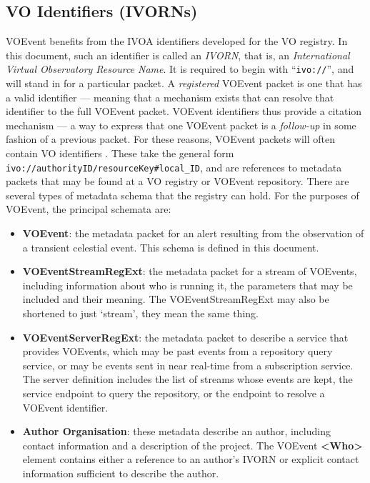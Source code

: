 \documentclass[11pt,a4paper]{ivoa}
\begin{document}
\subsection{VO Identifiers (IVORNs)}
\label{sec:2.2}
VOEvent benefits from the IVOA identifiers developed for the VO registry.
In this document, such
an identifier is called an \emph{IVORN}, that is, an \emph{International Virtual
Observatory Resource Name}. It is required to begin with ``{\tt ivo://}'', and
will stand in for a particular packet. A \emph{registered} VOEvent packet is one
that has a valid identifier --- meaning that a mechanism exists that can resolve
that identifier to the full VOEvent packet. VOEvent identifiers thus provide a
citation mechanism --- a way to express that one VOEvent packet is a
\emph{follow-up} in some fashion of a previous packet. For these reasons,
VOEvent packets will often contain VO identifiers \citep{2016ivoa.spec.0523D}.
These take the general form {\tt ivo://authorityID/resourceKey\#local\_ID}, and
are references to metadata packets that may be found at a VO registry or VOEvent
repository. There are several types of metadata schema that the registry can
hold. For the purposes of VOEvent, the principal schemata are:
\begin{itemize}
\item {\bf VOEvent}: the metadata packet for an alert resulting from the
observation of a transient celestial event. This schema is defined in this
document.
\item {\bf VOEventStreamRegExt}: the metadata packet for a stream of VOEvents,
including information about who is running it, the parameters that may be
included and their meaning. The VOEventStreamRegExt may also be shortened to
just `stream', they mean the same thing.
\item {\bf VOEventServerRegExt}: the metadata packet to describe a service that
provides VOEvents, which may be past events from a repository query service, or
may be events sent in near real-time from a subscription service. The server
definition includes the list of streams whose events are kept, the service
endpoint to query the repository, or the endpoint to resolve a VOEvent
identifier.
\item {\bf Author Organisation}: these metadata \citep{2007ivoa.spec.0302H}
describe an author, including contact information and a description of the
project. The VOEvent {\bf <Who>} element contains either a reference to an
author's IVORN or explicit contact information sufficient to describe the
author.
\end{itemize}
\end{document}
